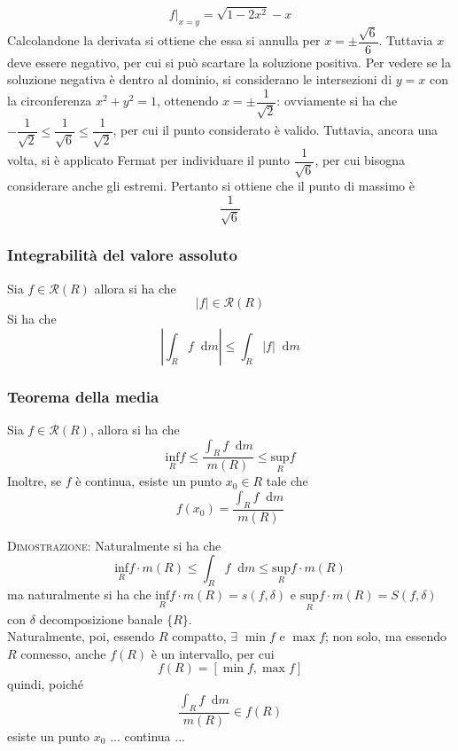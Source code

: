 \documentclass[a4paper]{extarticle}
\newcommand*\dif{\mathop{}\!\mathrm{d}}
\begin{document}
\begin{itemize}
    \[f \vert_{x=y} = \sqrt{1-2x^2}-x\]
    Calcolandone la derivata si ottiene che essa si annulla per $x=\pm \dfrac{\sqrt{6}}{6}$. Tuttavia $x$ deve essere negativo, per cui si può scartare la soluzione positiva. Per vedere se la soluzione negativa è dentro al dominio, si considerano le intersezioni di $y=x$ con la circonferenza $x^2+y^2=1$, ottenendo $x=\pm \dfrac{1}{\sqrt{2}}$: ovviamente si ha che $-\dfrac{1}{\sqrt{2}} \leq \dfrac{1}{\sqrt{6}} \leq \dfrac{1}{\sqrt{2}}$, per cui il punto considerato è valido. Tuttavia, ancora una volta, si è applicato Fermat per individuare il punto $\dfrac{1}{\sqrt{6}}$, per cui bisogna considerare anche gli estremi. Pertanto si ottiene
    che il punto di massimo è
    \[\dfrac{1}{\sqrt{6}}\]
\end{itemize}

\vspace{1em}
\subsubsection{Integrabilità del valore assoluto}
Sia $f \in \mathcal{R}(R)$ allora si ha che
\[\vert f \vert \in \mathcal{R}(R)\]
Si ha che
\[\left \vert \int_{R} f \dif m \right \vert \leq \int_R \vert f \vert \dif m\]

\vspace{1em}
\subsubsection{Teorema della media}
Sia $f \in \mathcal{R}(R)$, allora si ha che
\[\underset{R}{\text{inf}} f \leq \dfrac{\displaystyle{\int_R f \dif m}}{m(R)} \leq \underset{R}{\text{sup}} f\]
Inoltre, se $f$ è continua, esiste un punto $x_0 \in R$ tale che
\[f(x_0) = \dfrac{\displaystyle{\int_R f \dif m}}{m(R)}\]

\vspace{2em}
\noindent
\normalfont \normalsize
\textsc{Dimostrazione}: Naturalmente si ha che
\[\underset{R}{\text{inf}} f \cdot m(R) \leq \int_R f \dif m \leq \underset{R}{\text{sup}} f \cdot m(R)\]
ma naturalmente si ha che $\underset{R}{\text{inf}} f \cdot m(R) = s(f,\delta)$ e $\underset{R}{\text{sup}} f \cdot m(R) = S(f,\delta)$ con $\delta$ decomposizione banale $\{R\}$.\\
Naturalmente, poi, essendo $R$ compatto, $\exists$ $\min f$ e $\max f$; non solo, ma essendo $R$ connesso, anche $f(R)$ è un intervallo, per cui
\[f(R) = [\min f, \max f]\]
quindi, poiché
\[\dfrac{\displaystyle{\int_R f \dif m}}{m(R)} \in f(R)\]
esiste un punto $x_0$ ... continua ...
\end{document}
